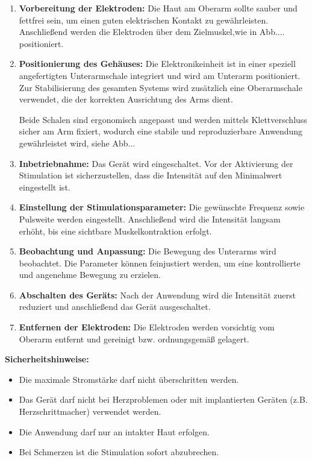 \documentclass{article}
\begin{document}
\begin{enumerate}
\item \textbf{Vorbereitung der Elektroden:}  
Die Haut am Oberarm sollte sauber und fettfrei sein, um einen guten elektrischen Kontakt zu gewährleisten. Anschließend werden die Elektroden über dem Zielmuskel,wie in Abb.... positioniert.

\item \textbf{Positionierung des Gehäuses:}  
Die Elektronikeinheit ist in einer speziell angefertigten Unterarmschale integriert und wird am Unterarm positioniert. Zur Stabilisierung des gesamten Systems wird zusätzlich eine Oberarmschale verwendet, die der korrekten Ausrichtung des Arms dient.  

Beide Schalen sind ergonomisch angepasst und werden mittels Klettverschluss sicher am Arm fixiert, wodurch eine stabile und reproduzierbare Anwendung gewährleistet wird, siehe Abb...

\item \textbf{Inbetriebnahme:}  
Das Gerät wird eingeschaltet. Vor der Aktivierung der Stimulation ist sicherzustellen, dass die Intensität auf den Minimalwert eingestellt ist.

\item \textbf{Einstellung der Stimulationsparameter:}  
Die gewünschte Frequenz sowie Pulsweite werden eingestellt. Anschließend wird die Intensität langsam erhöht, bis eine sichtbare Muskelkontraktion erfolgt.

\item \textbf{Beobachtung und Anpassung:}  
Die Bewegung des Unterarms wird beobachtet. Die Parameter können feinjustiert werden, um eine kontrollierte und angenehme Bewegung zu erzielen.

\item \textbf{Abschalten des Geräts:}  
Nach der Anwendung wird die Intensität zuerst reduziert und anschließend das Gerät ausgeschaltet.

\item \textbf{Entfernen der Elektroden:}  
Die Elektroden werden vorsichtig vom Oberarm entfernt und gereinigt bzw. ordnungsgemäß gelagert.
\end{enumerate}

\textbf{Sicherheitshinweise:}
\begin{itemize}
\item Die maximale Stromstärke darf nicht überschritten werden.
\item Das Gerät darf nicht bei Herzproblemen oder mit implantierten Geräten (z.B. Herzschrittmacher) verwendet werden.
\item Die Anwendung darf nur an intakter Haut erfolgen.
\item Bei Schmerzen ist die Stimulation sofort abzubrechen.
\end{itemize}
\newpage
\end{document}
